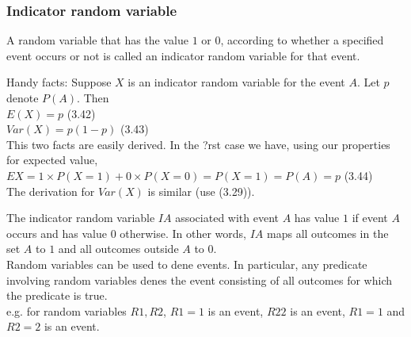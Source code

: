 \documentclass{article}
\begin{document}
\subsubsection{Indicator random variable}
A random variable that has the value $1$ or $0$, according to whether a specified event occurs or
not is called an indicator random variable for that event.

Handy facts: Suppose $X$ is an indicator random variable for the event $A$. Let $p$ denote $P(A)$.
Then\\
$E(X) = p$ (3.42)\\
$Var(X) = p(1 - p)$ (3.43)\\
This two facts are easily derived. In the ?rst case we have, using our properties for expected value,\\
$EX = 1 \times P(X = 1) + 0 \times P(X = 0) = P(X = 1) = P(A) = p$ (3.44)\\
The derivation for $Var(X)$ is similar (use (3.29)).

The indicator random variable $IA$ associated with event $A$ has value $1$ if event $A$ occurs and has value $0$ otherwise. In other words, $IA$ maps all outcomes in the set $A$ to $1$ and all outcomes outside $A$ to $0$.\\
Random variables can be used to dene events. In particular, any predicate involving
random variables denes the event consisting of all outcomes for which the predicate is true.\\
e.g. for random variables $R1, R2$, $R1 = 1$ is an event, $R2  2$ is an event, $R1 = 1$ and $R2 = 2$ is an event.
\end{document}
